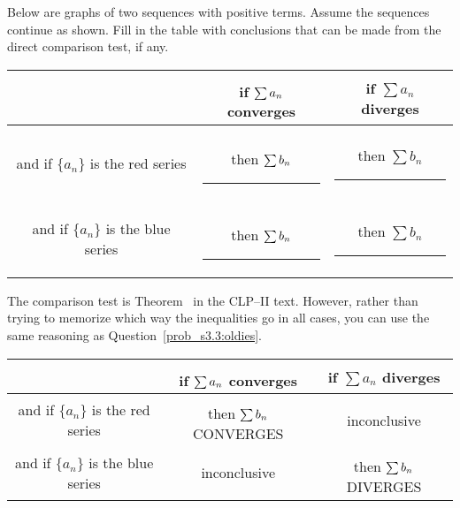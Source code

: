 \begin{question}\label{prob_s3.3:compareintuitive}
Below are graphs of two sequences with positive terms.  Assume the sequences continue as shown. Fill in the table with conclusions that can be made from the direct comparison test, if any.
\begin{center}\end{center}
\begin{center}\begin{tabular}{|c|c|c|}
\hline
& if $\sum\limits^{\vphantom{\frac12}} a_n$ converges & if $\sum a_n$ diverges\\[10pt]
\hline
\color{red} and if $\{a_n\}$ is the red series& \color{blue}then $\sum\limits^{\vphantom{\frac12}} b_n$ \rule{1.5cm}{1pt}& \color{blue}then $\sum b_n$ \rule{1.5cm}{1pt}\\[10pt]
\hline
\color{blue} and if $\{a_n\}$ is the blue series& \color{red}then $\sum\limits^{\vphantom{\frac12}} b_n$ \rule{1.5cm}{1pt}& \color{red}then $\sum b_n$ \rule{1.5cm}{1pt}\\[10pt]
\hline
\end{tabular}\end{center}
\end{question}
\begin{hint}
The comparison test is Theorem~ in the CLP--II text. However, rather than trying to memorize which way the inequalities go in all cases, you can use the same reasoning as Question~\ref{prob_s3.3:oldies}.
\end{hint}
\begin{answer}

\begin{tabular}{|c|c|c|}
\hline
& if $\sum\limits^{\vphantom{\frac12}} a_n$ converges & if $\sum a_n$ diverges\\[10pt]
\hline
\color{red} and if $\{a_n\}$ is the red series& \color{blue}then $\sum\limits^{\vphantom{\frac12}} b_n$ CONVERGES&inconclusive \\[10pt]
\hline
\color{blue} and if $\{a_n\}$ is the blue series&inconclusive& \color{red}then $\sum\limits^{\vphantom{\frac12}} b_n$ DIVERGES\\[10pt]
\hline
\end{tabular}
\end{answer}
